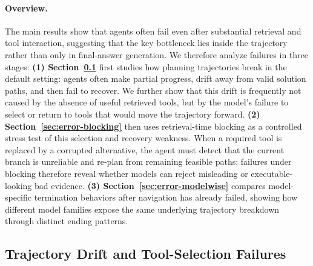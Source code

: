 \documentclass{llmxive}
\begin{document}
\paragraph{Overview.}
The main results show that agents often fail even after substantial retrieval and tool interaction, suggesting that the key bottleneck lies inside the trajectory rather than only in final-answer generation.
We therefore analyze failures in three stages:
\textbf{(1) Section~\ref{sec:error-planning-failures}} first studies how planning trajectories break in the default setting: agents often make partial progress, drift away from valid solution paths, and then fail to recover.
We further show that this drift is frequently not caused by the absence of useful retrieved tools, but by the model's failure to select or return to tools that would move the trajectory forward.
\textbf{(2) Section~\ref{sec:error-blocking}} then uses retrieval-time blocking as a controlled stress test of this selection and recovery weakness.
When a required tool is replaced by a corrupted alternative, the agent must detect that the current branch is unreliable and re-plan from remaining feasible paths; failures under blocking therefore reveal whether models can reject misleading or executable-looking bad evidence.
\textbf{(3) Section~\ref{sec:error-modelwise}} compares model-specific termination behaviors after navigation has already failed, showing how different model families expose the same underlying trajectory breakdown through distinct ending patterns. 


\subsection{Trajectory Drift and Tool-Selection Failures}
\label{sec:error-planning-failures}
\end{document}
